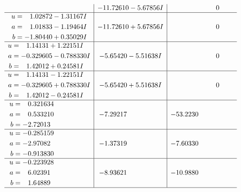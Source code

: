 \documentclass[1p]{elsarticle_modified}
\theoremstyle{definition}
\begin{document}
$$\begin{array}{c|c|c}
 & -11.72610 - 5.67856 I & \phantom{-0.000000 } 0 \\ \hline\begin{aligned}
u &= \phantom{-}1.02872 - 1.31167 I \\
a &= \phantom{-}1.01833 - 1.19464 I \\
b &= -1.80440 + 0.35029 I\end{aligned}
 & -11.72610 + 5.67856 I & \phantom{-0.000000 } 0 \\ \hline\begin{aligned}
u &= \phantom{-}1.14131 + 1.22151 I \\
a &= -0.329605 - 0.788330 I \\
b &= \phantom{-}1.42012 + 0.24581 I\end{aligned}
 & -5.65420 - 5.51638 I & \phantom{-0.000000 } 0 \\ \hline\begin{aligned}
u &= \phantom{-}1.14131 - 1.22151 I \\
a &= -0.329605 + 0.788330 I \\
b &= \phantom{-}1.42012 - 0.24581 I\end{aligned}
 & -5.65420 + 5.51638 I & \phantom{-0.000000 } 0 \\ \hline\begin{aligned}
u &= \phantom{-}0.321634\phantom{ +0.000000I} \\
a &= \phantom{-}0.533210\phantom{ +0.000000I} \\
b &= -2.72013\phantom{ +0.000000I}\end{aligned}
 & -7.29217\phantom{ +0.000000I} & -53.2230\phantom{ +0.000000I} \\ \hline\begin{aligned}
u &= -0.285159\phantom{ +0.000000I} \\
a &= -2.97082\phantom{ +0.000000I} \\
b &= -0.913830\phantom{ +0.000000I}\end{aligned}
 & -1.37319\phantom{ +0.000000I} & -7.60330\phantom{ +0.000000I} \\ \hline\begin{aligned}
u &= -0.223928\phantom{ +0.000000I} \\
a &= \phantom{-}6.02391\phantom{ +0.000000I} \\
b &= \phantom{-}1.64889\phantom{ +0.000000I}\end{aligned}
 & -8.93621\phantom{ +0.000000I} & -10.9880\phantom{ +0.000000I}\\
 \hline 
 \end{array}$$\newpage\newpage\renewcommand{\arraystretch}{1}
\end{document}
